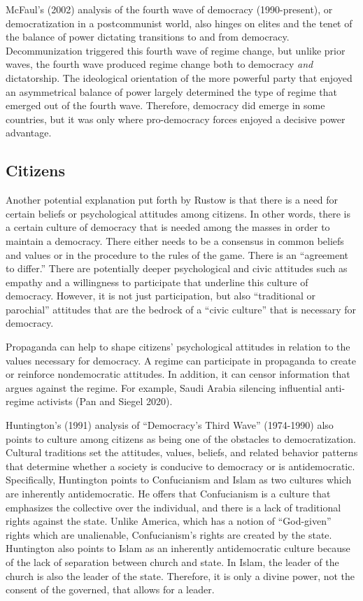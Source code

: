 \documentclass[12pt,]{article}
\begin{document}
McFaul's (2002) analysis of the fourth wave of democracy (1990-present),
or democratization in a postcommunist world, also hinges on elites and
the tenet of the balance of power dictating transitions to and from
democracy. Decommunization triggered this fourth wave of regime change,
but unlike prior waves, the fourth wave produced regime change both to
democracy \emph{and} dictatorship. The ideological orientation of the
more powerful party that enjoyed an asymmetrical balance of power
largely determined the type of regime that emerged out of the fourth
wave. Therefore, democracy did emerge in some countries, but it was only
where pro-democracy forces enjoyed a decisive power advantage.

\hypertarget{citizens}{%
\subsection{Citizens}\label{citizens}}

Another potential explanation put forth by Rustow is that there is a
need for certain beliefs or psychological attitudes among citizens. In
other words, there is a certain culture of democracy that is needed
among the masses in order to maintain a democracy. There either needs to
be a consensus in common beliefs and values or in the procedure to the
rules of the game. There is an ``agreement to differ.'' There are
potentially deeper psychological and civic attitudes such as empathy and
a willingness to participate that underline this culture of democracy.
However, it is not just participation, but also ``traditional or
parochial'' attitudes that are the bedrock of a ``civic culture'' that
is necessary for democracy.

Propaganda can help to shape citizens' psychological attitudes in
relation to the values necessary for democracy. A regime can participate
in propaganda to create or reinforce nondemocratic attitudes. In
addition, it can censor information that argues against the regime. For
example, Saudi Arabia silencing influential anti-regime activists (Pan
and Siegel 2020).

Huntington's (1991) analysis of ``Democracy's Third Wave'' (1974-1990)
also points to culture among citizens as being one of the obstacles to
democratization. Cultural traditions set the attitudes, values, beliefs,
and related behavior patterns that determine whether a society is
conducive to democracy or is antidemocratic. Specifically, Huntington
points to Confucianism and Islam as two cultures which are inherently
antidemocratic. He offers that Confucianism is a culture that emphasizes
the collective over the individual, and there is a lack of traditional
rights against the state. Unlike America, which has a notion of
``God-given'' rights which are unalienable, Confucianism's rights are
created by the state. Huntington also points to Islam as an inherently
antidemocratic culture because of the lack of separation between church
and state. In Islam, the leader of the church is also the leader of the
state. Therefore, it is only a divine power, not the consent of the
governed, that allows for a leader.
\end{document}

